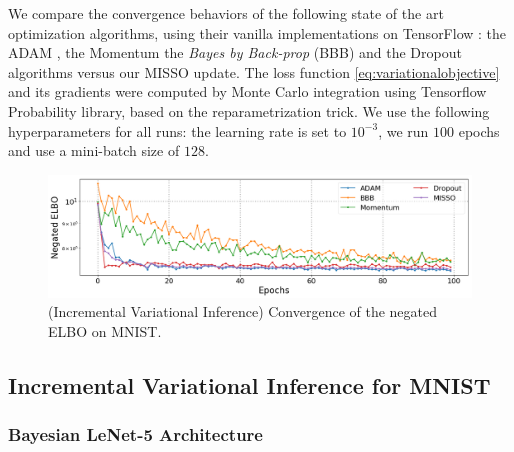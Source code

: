 \documentclass[11pt]{article}
\theoremstyle{t}
\begin{document}
We compare the convergence behaviors of the following state of the art optimization algorithms, using their vanilla implementations on TensorFlow \citep{tensorflow2015-whitepaper}: the ADAM \citep{kingma:adam}, the Momentum \citep{sutskever2013mom} the \textit{Bayes by Back-prop} (BBB) \citep{blundell2015weight} and the Dropout \citep{hinton2012dropout} algorithms versus our MISSO update.
The loss function \eqref{eq:variationalobjective} and its gradients were computed by Monte Carlo integration using Tensorflow Probability library, based on the reparametrization trick.
We use the following hyperparameters for all runs: the learning rate is set to $10^{-3}$, we run $100$ epochs and use a mini-batch size of $128$.\vspace{-.2cm}



\begin{figure}[H]
  \centering
    \includegraphics[width=.9\textwidth]{pic_paper/bnn2.png}\vspace{-.2cm}
  \caption{(Incremental Variational Inference) Convergence of the negated ELBO on MNIST.}
  \label{fig:misso}
\end{figure}





\newpage

\appendix

 \subsection{Incremental Variational Inference for MNIST}
 \subsubsection{Bayesian LeNet-5 Architecture}\label{appendix:bnn}
\end{document}
